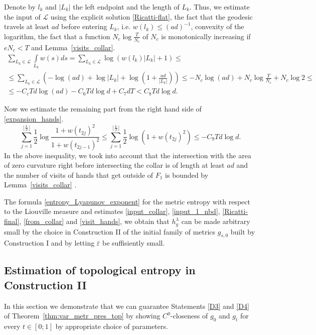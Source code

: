 \documentclass[12pt]{article}
\numberwithin{equation}{section}
\theoremstyle{definition}
\newcommand{\eps}{\varepsilon}
\begin{document}
Denote by $l_k$ and $|L_k|$ the left endpoint and the length of $L_k$. Thus, we estimate the input of $\mathcal L$ using the explicit solution \eqref{Ricatti-flat}, the fact that the geodesic travels at least $a d$ before entering $L_k$, i.e. $w(l_k)\leqslant (a d)^{-1}$, convexity of the logarithm, the fact that a function $N_c\log\frac{T}{N_c}$ of $N_c$ is monotonically increasing if $eN_c<T$ and Lemma~\ref{visits_collar}.
\begin{multline}\label{from_collar}
\sum\limits_{L_k\in\mathcal L}\int\limits_{L_k} w(s) ds = \sum\limits_{L_k\in\mathcal L}\log(w(l_k)|L_k|+1)\leqslant\\\leqslant \sum\limits_{L_k\in\mathcal L}\left(-\log (a d)+\log|L_k|+\log(1+\frac{ad}{|L_k|})\right)\leqslant -N_c\log(a d) + N_c\log\frac{T}{N_c} +N_c\log 2\leqslant\\\leqslant -C_cTd\log(a d)-C_6 Td\log d +C_7dT< C_8Td\log d.
\end{multline} 


Now we estimate the remaining part from the right hand side of \eqref{expansion_hands}.
\begin{equation}\label{visit_hands}
\sum\limits_{j=1}^{\lfloor\frac{L}{2}\rfloor}\frac{1}{2}\log\frac{1+w(t_{2j})^2}{1+w(t_{2j-1})^2}\leqslant \sum\limits_{j=1}^{\lfloor\frac{L}{2}\rfloor}\frac{1}{2}\log(1+w(t_{2j})^2)\leqslant -C_9Td\log d.
\end{equation}
In the above inequality, we took into account that the intersection with the area of zero curvature right before intersecting the collar is of length at least $a d$ and the number of visits of hands that get outside of $F_1$ is bounded by Lemma~\ref{visits_collar} . 

The formula \eqref{entropy_Lyapunov_exponent} for the metric entropy with respect to the Liouville measure and estimates \eqref{input_collar}, \eqref{input_1_nbd}, \eqref{Ricatti-final}, \eqref{from_collar} and \eqref{visit_hands}, we obtain that $h^\lambda_g$ can be made arbitrary small by the choice in Construction II of the initial family of metrics $g_{s,0}$ built by Construction I and by letting $\bar\eps$ be suffisiently small.

\subsection{Estimation of topological entropy in Construction II}\label{top_3}

In this section we demonstrate that we can guarantee Statements \ref{D3} and \ref{D4} of Theorem~\ref{thm:var_metr_pres_top} by showing $C^0$-closeness of $g_0$ and $g_t$ for every $t\in[0;1]$ by appropriate choice of parameters.
\end{document}
